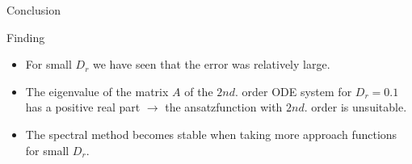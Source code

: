 \begin{comment}
\begin{frame}{Elongational flow: Stability analysis}
	\begin{columns}
		\begin{column}{0.5\textwidth}
			\begin{figure}
				\texttt{[image: Bilder/elongational\_l=1\_lsg\_ueber\_Zeit\_14th]}
				\caption{Coefficients as function of time}
			\end{figure}
		\end{column}
		\begin{column}{0.5\textwidth}
			\begin{figure}
				\texttt{[image: Bilder/Stability\_analysis\_14th\_dr0.1]}
				\caption{Eigenvalue of matrix $A$}
			\end{figure}
		\end{column}
	\end{columns}
	\centering
	With $14th.$ order and $D_r = 0.1$.
\end{frame}
\end{comment}

\begin{comment}
\begin{frame}{Elongational flow: Stability analysis}
	\begin{figure}
		\centering
		\begin{minipage}{0.4\linewidth}
			\texttt{[image: Bilder/Stability\_analysis\_2nd\_dr1]}
		\end{minipage}
		\hspace{1cm}
		\begin{minipage}{0.4\linewidth}
			\centering
			\texttt{[image: Bilder/Stability\_analysis\_2nd\_dr0.14]}
		\end{minipage}
		\caption{Eigenvalue of matrix $A$ with basis functions of $2nd.$ order}
	\end{figure}
	
	\begin{block}{Finding 1}
		The maximum value of eigenvalue of matrix $A$ with basis functions of $2nd.$ order is $0.01714 > 0$. It follows:
		Sprectal method for $2nd.$ order is unstable with $D_r < 0.15$.
	\end{block}
\end{frame}
\end{comment}


\begin{frame}{Conclusion}
	\begin{block}{Finding}
		\begin{itemize}
			\item For small $D_r$ we have seen that the error was relatively large.
			\item The eigenvalue of the matrix $A$ of the $2nd.$ order ODE system for $D_r = 0.1$ has a positive real part $\rightarrow$
			the ansatzfunction with $2nd.$ order is unsuitable.
			\item 	The spectral method becomes stable when taking more approach functions for small $D_r$.
		\end{itemize}
	\end{block}
\end{frame}


